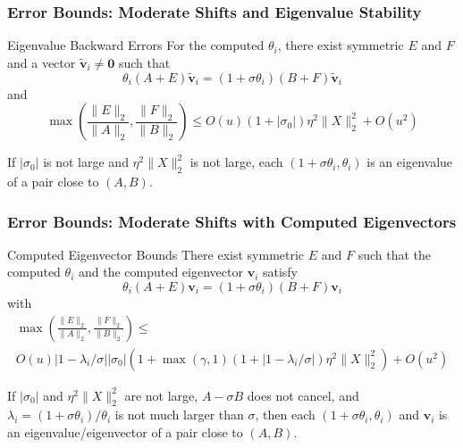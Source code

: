 \documentclass[landscape]{beamer}
\renewcommand{\vec}[1]{\bm{#1}}
\begin{document}
\begin{frame}
  \frametitle{Error Bounds: Moderate Shifts and Eigenvalue Stability}

  \begin{block}{Eigenvalue Backward Errors}
    For the computed $\theta_i$, there exist symmetric $E$ and $F$ and
    a vector $\tilde{\vec{v}}_i\neq \vec{0}$ such that
    \begin{equation*}
      \theta_i (A+E) \tilde{\vec{v}}_i = (1+\sigma \theta_i) (B+F) \tilde{\vec{v}}_i
    \end{equation*}
    and
    \begin{equation*}
      \max\left(\frac{\|E\|_2}{\|A\|_2}, \frac{\|F\|_2}{\|B\|_2}\right) \leq 
      O(u) (1+|\sigma_0|) \eta^2 \|X\|_2^2 + O(u^2)
    \end{equation*}
  \end{block}

  If $|\sigma_0|$ is not large and $\eta^2 \|X\|_2^2$ is not large, each
  $(1+\sigma \theta_i, \theta_i)$ is an eigenvalue of a pair close to $(A,B)$.
\end{frame}

\begin{frame}
  \frametitle{Error Bounds: Moderate Shifts with Computed Eigenvectors}

  \begin{block}{Computed Eigenvector Bounds}
    There exist symmetric
    $E$ and $F$ such that the computed $\theta_i$ and the computed
    eigenvector $\vec{v}_i$ satisfy
    \begin{equation*}
      \theta_i (A+E) \vec{v}_i = (1+\sigma \theta_i) (B+F) \vec{v}_i
    \end{equation*}
    with
    \begin{multline*}
      \max\left(\frac{\|E\|_2}{\|A\|_2}, \frac{\|F\|_2}{\|B\|_2}\right) \leq \\
      O(u) |1-\lambda_i/\sigma| |\sigma_0| \left(1 + \max(\gamma,1)
      \left(1+ |1-\lambda_i/\sigma|\right)\eta^2\|X\|_2^2\right) +O(u^2)
    \end{multline*}
  \end{block}
  
  If $|\sigma_0|$ and $\eta^2 \|X\|_2^2$ are not large, $A-\sigma B$
  does not cancel, and $\lambda_i = (1+\sigma\theta_i)/\theta_i$ is
  not much larger than $\sigma$, then each
  $(1+\sigma \theta_i, \theta_i)$ and $\vec{v}_i$ is an
  eigenvalue/eigenvector of a pair close to $(A,B)$.
\end{frame}
\end{document}
